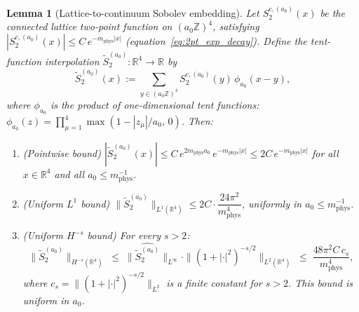 \documentclass[11pt,a4paper]{amsart}
\newtheorem{lemma}[theorem]{Lemma}
\theoremstyle{definition}
\newcommand{\Z}{\mathbb{Z}}
\newcommand{\R}{\mathbb{R}}
\begin{document}
\begin{lemma}[Lattice-to-continuum Sobolev embedding]
\label{lem:sobolev_embedding}
Let $S_2^{c,(a_0)}(x)$ be the connected lattice two-point function on
$(a_0\Z)^4$, satisfying $|S_2^{c,(a_0)}(x)| \le C\,e^{-m_{\mathrm{phys}}|x|}$
\textup{(}equation~\eqref{eq:2pt_exp_decay}\textup{)}.
Define the \emph{tent-function interpolation}
$\widetilde{S}_2^{(a_0)} : \R^4 \to \R$ by
\begin{equation}
\label{eq:tent_interp}
  \widetilde{S}_2^{(a_0)}(x)
  := \sum_{y \in (a_0\Z)^4} S_2^{c,(a_0)}(y)\,\phi_{a_0}(x - y),
\end{equation}
where $\phi_{a_0}$ is the product of one-dimensional tent functions:
$\phi_{a_0}(z) = \prod_{\mu=1}^4 \max(1 - |z_\mu|/a_0,\, 0)$.
Then:
\begin{enumerate}[label=(\roman*)]
\item \emph{(Pointwise bound)}
      $|\widetilde{S}_2^{(a_0)}(x)| \le C\,e^{2m_{\mathrm{phys}}a_0}\,e^{-m_{\mathrm{phys}}|x|}
      \le 2C\,e^{-m_{\mathrm{phys}}|x|}$
      for all $x \in \R^4$ and all $a_0 \le m_{\mathrm{phys}}^{-1}$.
\item \emph{(Uniform $L^1$ bound)}
      $\|\widetilde{S}_2^{(a_0)}\|_{L^1(\R^4)} \le 2C \cdot \dfrac{24\pi^2}{m_{\mathrm{phys}}^4}$,
      uniformly in $a_0 \le m_{\mathrm{phys}}^{-1}$.
\item \emph{(Uniform $H^{-s}$ bound)} For every $s > 2$:
      \[
        \|\widetilde{S}_2^{(a_0)}\|_{H^{-s}(\R^4)}
        \;\le\;
        \|\widehat{\widetilde{S}_2^{(a_0)}}\|_{L^\infty}
        \cdot \|(1+|\cdot|^2)^{-s/2}\|_{L^2(\R^4)}
        \;\le\;
        \frac{48\pi^2 C\,c_s}{m_{\mathrm{phys}}^4},
      \]
      where $c_s = \|(1+|\cdot|^2)^{-s/2}\|_{L^2}$ is a finite constant for $s > 2$.
      This bound is \emph{uniform in $a_0$}.
\end{enumerate}
\end{lemma}
\end{document}
